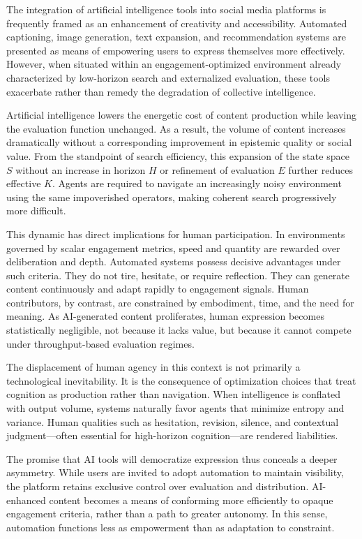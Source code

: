 \documentclass[12pt]{article}
\begin{document}
The integration of artificial intelligence tools into social media platforms is frequently framed as an enhancement of creativity and accessibility. Automated captioning, image generation, text expansion, and recommendation systems are presented as means of empowering users to express themselves more effectively. However, when situated within an engagement-optimized environment already characterized by low-horizon search and externalized evaluation, these tools exacerbate rather than remedy the degradation of collective intelligence.

Artificial intelligence lowers the energetic cost of content production while leaving the evaluation function unchanged. As a result, the volume of content increases dramatically without a corresponding improvement in epistemic quality or social value. From the standpoint of search efficiency, this expansion of the state space \( S \) without an increase in horizon \( H \) or refinement of evaluation \( E \) further reduces effective \( K \). Agents are required to navigate an increasingly noisy environment using the same impoverished operators, making coherent search progressively more difficult.

This dynamic has direct implications for human participation. In environments governed by scalar engagement metrics, speed and quantity are rewarded over deliberation and depth. Automated systems possess decisive advantages under such criteria. They do not tire, hesitate, or require reflection. They can generate content continuously and adapt rapidly to engagement signals. Human contributors, by contrast, are constrained by embodiment, time, and the need for meaning. As AI-generated content proliferates, human expression becomes statistically negligible, not because it lacks value, but because it cannot compete under throughput-based evaluation regimes.

The displacement of human agency in this context is not primarily a technological inevitability. It is the consequence of optimization choices that treat cognition as production rather than navigation. When intelligence is conflated with output volume, systems naturally favor agents that minimize entropy and variance. Human qualities such as hesitation, revision, silence, and contextual judgment—often essential for high-horizon cognition—are rendered liabilities.

The promise that AI tools will democratize expression thus conceals a deeper asymmetry. While users are invited to adopt automation to maintain visibility, the platform retains exclusive control over evaluation and distribution. AI-enhanced content becomes a means of conforming more efficiently to opaque engagement criteria, rather than a path to greater autonomy. In this sense, automation functions less as empowerment than as adaptation to constraint.
\end{document}
